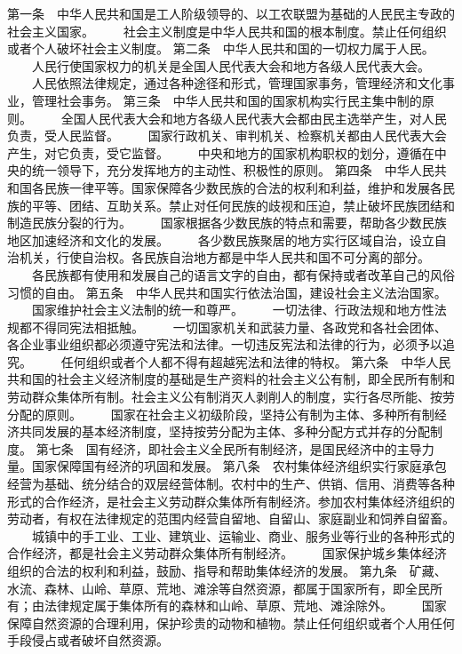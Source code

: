      第一条　中华人民共和国是工人阶级领导的、以工农联盟为基础的人民民主专政的社会主义国家。
　　社会主义制度是中华人民共和国的根本制度。禁止任何组织或者个人破坏社会主义制度。
     第二条　中华人民共和国的一切权力属于人民。
　　人民行使国家权力的机关是全国人民代表大会和地方各级人民代表大会。
　　人民依照法律规定，通过各种途径和形式，管理国家事务，管理经济和文化事业，管理社会事务。
     第三条　中华人民共和国的国家机构实行民主集中制的原则。
　　全国人民代表大会和地方各级人民代表大会都由民主选举产生，对人民负责，受人民监督。
　　国家行政机关、审判机关、检察机关都由人民代表大会产生，对它负责，受它监督。
　　中央和地方的国家机构职权的划分，遵循在中央的统一领导下，充分发挥地方的主动性、积极性的原则。
     第四条　中华人民共和国各民族一律平等。国家保障各少数民族的合法的权利和利益，维护和发展各民族的平等、团结、互助关系。禁止对任何民族的歧视和压迫，禁止破坏民族团结和制造民族分裂的行为。
　　国家根据各少数民族的特点和需要，帮助各少数民族地区加速经济和文化的发展。
 　　各少数民族聚居的地方实行区域自治，设立自治机关，行使自治权。各民族自治地方都是中华人民共和国不可分离的部分。
　　各民族都有使用和发展自己的语言文字的自由，都有保持或者改革自己的风俗习惯的自由。
     第五条　中华人民共和国实行依法治国，建设社会主义法治国家。
　　国家维护社会主义法制的统一和尊严。
　　一切法律、行政法规和地方性法规都不得同宪法相抵触。
 　　一切国家机关和武装力量、各政党和各社会团体、各企业事业组织都必须遵守宪法和法律。一切违反宪法和法律的行为，必须予以追究。
　　任何组织或者个人都不得有超越宪法和法律的特权。
     第六条　中华人民共和国的社会主义经济制度的基础是生产资料的社会主义公有制，即全民所有制和劳动群众集体所有制。社会主义公有制消灭人剥削人的制度，实行各尽所能、按劳分配的原则。
 　　国家在社会主义初级阶段，坚持公有制为主体、多种所有制经济共同发展的基本经济制度，坚持按劳分配为主体、多种分配方式并存的分配制度。
     第七条　国有经济，即社会主义全民所有制经济，是国民经济中的主导力量。国家保障国有经济的巩固和发展。
     第八条　农村集体经济组织实行家庭承包经营为基础、统分结合的双层经营体制。农村中的生产、供销、信用、消费等各种形式的合作经济，是社会主义劳动群众集体所有制经济。参加农村集体经济组织的劳动者，有权在法律规定的范围内经营自留地、自留山、家庭副业和饲养自留畜。
 　　城镇中的手工业、工业、建筑业、运输业、商业、服务业等行业的各种形式的合作经济，都是社会主义劳动群众集体所有制经济。
　　国家保护城乡集体经济组织的合法的权利和利益，鼓励、指导和帮助集体经济的发展。
     第九条　矿藏、水流、森林、山岭、草原、荒地、滩涂等自然资源，都属于国家所有，即全民所有；由法律规定属于集体所有的森林和山岭、草原、荒地、滩涂除外。
 　　国家保障自然资源的合理利用，保护珍贵的动物和植物。禁止任何组织或者个人用任何手段侵占或者破坏自然资源。
